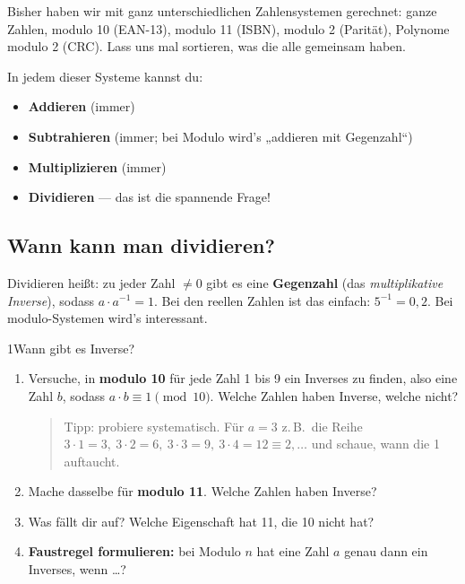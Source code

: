 Bisher haben wir mit ganz unterschiedlichen Zahlensystemen gerechnet:
ganze Zahlen, modulo 10 (EAN-13), modulo 11 (ISBN), modulo 2
(Parität), Polynome modulo 2 (CRC). Lass uns mal sortieren, was die
alle gemeinsam haben.

In jedem dieser Systeme kannst du:

\begin{itemize}
\item \textbf{Addieren} (immer)
\item \textbf{Subtrahieren} (immer; bei Modulo wird's „addieren mit
  Gegenzahl“)
\item \textbf{Multiplizieren} (immer)
\item \textbf{Dividieren} — das ist die spannende Frage!
\end{itemize}

\subsection*{Wann kann man dividieren?}

Dividieren heißt: zu jeder Zahl $\ne 0$ gibt es eine \textbf{Gegenzahl}
(das \emph{multiplikative Inverse}), sodass $a \cdot a^{-1} = 1$. Bei
den reellen Zahlen ist das einfach: $5^{-1} = 0{,}2$. Bei
modulo-Systemen wird's interessant.

\begin{bleistiftuebung}{1}{Wann gibt es Inverse?}
\begin{enumerate}[label=(\alph*), leftmargin=*]
\item Versuche, in \textbf{modulo 10} für jede Zahl 1 bis 9 ein
  Inverses zu finden, also eine Zahl $b$, sodass $a \cdot b \equiv 1
  \pmod{10}$. Welche Zahlen haben Inverse, welche nicht?

  \begin{quote}
  Tipp: probiere systematisch. Für $a = 3$ z.\,B.\ die Reihe
  $3 \cdot 1 = 3,\ 3 \cdot 2 = 6,\ 3 \cdot 3 = 9,\ 3 \cdot 4 = 12
  \equiv 2, \dots$ und schaue, wann die 1 auftaucht.
  \end{quote}

\item Mache dasselbe für \textbf{modulo 11}. Welche Zahlen haben
  Inverse?

\item Was fällt dir auf? Welche Eigenschaft hat 11, die 10 nicht hat?

\item \textbf{Faustregel formulieren:} bei Modulo $n$ hat eine Zahl
  $a$ genau dann ein Inverses, wenn \dots?
\end{enumerate}
\end{bleistiftuebung}

